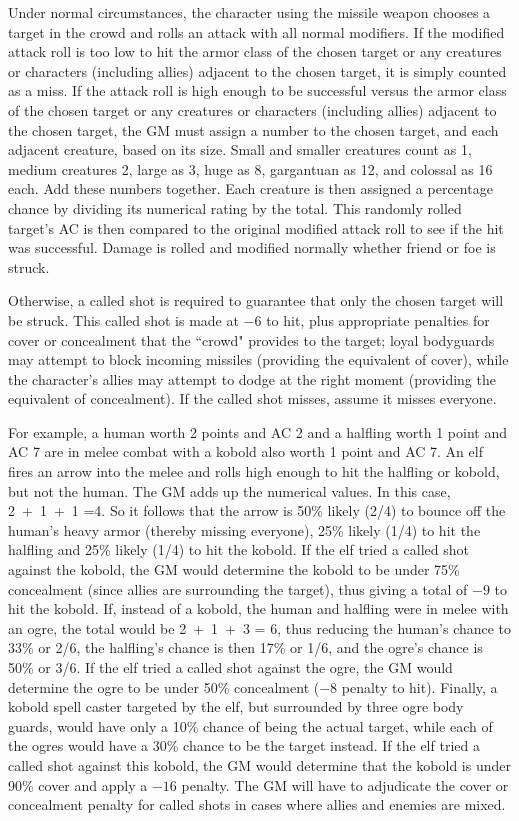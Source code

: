 \begin{multicols}{2}
Under normal circumstances, the character using the missile weapon chooses a target in the crowd and rolls an attack with all normal modifiers. If the modified attack roll is too low to hit the armor class of the chosen target or any creatures or characters (including allies) adjacent to the chosen target, it is simply counted as a miss.  If the attack roll is high enough to be successful versus the armor class of the chosen target or any creatures or characters (including allies) adjacent to the chosen target, the GM must assign a number to the chosen target, and each adjacent creature, based on its size.  Small and smaller creatures count as 1, medium creatures 2, large as 3, huge as 8, gargantuan as 12, and colossal as 16 each.  Add these numbers together. Each creature is then assigned a percentage chance by dividing its numerical rating by the total.  This randomly rolled target's AC is then compared to the original modified attack roll to see if the hit was successful.  Damage is rolled and modified normally whether friend or foe is struck.  

Otherwise, a called shot is required to guarantee that only the chosen target will be struck.  This called shot is made at $-6$ to hit, plus appropriate penalties for cover or concealment that the ``crowd" provides to the target; loyal bodyguards may attempt to block incoming missiles (providing the equivalent of cover), while the character's allies may attempt to dodge at the right moment (providing the equivalent of concealment).  If the called shot misses, assume it misses everyone.

For example, a human worth 2 points and AC 2 and a halfling worth 1 point and AC 7 are in melee combat with a kobold also worth 1 point and AC 7. An elf fires an arrow into the melee and rolls high enough to hit the halfling or kobold, but not the human. The GM adds up the numerical values. In this case, 2~+~1~+~1 =4.  So it follows that the arrow is 50\% likely (2/4) to bounce off the human's heavy armor (thereby missing everyone), 25\% likely (1/4) to hit the halfling and 25\% likely (1/4) to hit the kobold. If the elf tried a called shot against the kobold, the GM would determine the kobold to be under 75\% concealment (since allies are surrounding the target), thus giving a total of $-9$ to hit the kobold.  If, instead of a kobold, the human and halfling were in melee with an ogre, the total would be 2~+~1~+~3 = 6, thus reducing the human's chance to 33\% or 2/6, the halfling's chance is then 17\% or 1/6, and the ogre's chance is 50\% or 3/6.  If the elf tried a called shot against the ogre, the GM would determine the ogre to be under 50\% concealment ($-8$ penalty to hit).  Finally, a kobold spell caster targeted by the elf, but surrounded by three ogre body guards, would have only a 10\% chance of being the actual target, while each of the ogres would have a 30\% chance to be the target instead.  If the elf tried a called shot against this kobold, the GM would determine that the kobold is under 90\% cover and apply a $-16$ penalty.  The GM will have to adjudicate the cover or concealment penalty for called shots in cases where allies and enemies are mixed.


\end{multicols}
